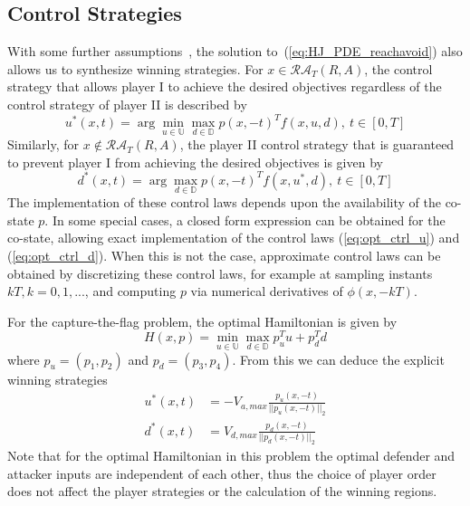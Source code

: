 \documentclass[letterpaper, 10 pt, conference]{ieeeconf}  %
\numberwithin{algorithm}{section}
\begin{document}
\subsection{Control Strategies}
\label{sub:ctrl_inputs}
With some further assumptions~\cite{j:Lygeros-automatica-1999,j:Tomlin-ProcIEEE-2000}, the solution to~(\ref{eq:HJ_PDE_reachavoid}) also allows us to synthesize winning strategies.  For $x \in \mathcal{RA}_T(R,A)$, the control strategy that allows player I to achieve the desired objectives regardless of the control strategy of player II is described by
\begin{equation}
	\label{eq:opt_ctrl_u}
  u^*(x,t) = \arg \min_{u \in \mathbb{U}} \max_{d \in \mathbb{D}} p(x,-t)^T f(x,u,d), \ t \in [0,T] 
\end{equation}
Similarly, for $x \notin \mathcal{RA}_T(R,A)$, the player II control strategy that is guaranteed to prevent player I from achieving the desired objectives is given by
\begin{equation}
	\label{eq:opt_ctrl_d}
  d^*(x,t) = \arg \max_{d \in \mathbb{D}} p(x,-t)^T f(x,u^*,d), \ t \in [0,T] 
\end{equation}
The implementation of these control laws depends upon the availability of the co-state $p$.  In some special cases, a closed form expression can be obtained for the co-state, allowing exact implementation of the control laws (\ref{eq:opt_ctrl_u}) and (\ref{eq:opt_ctrl_d}).  When this is not the case, approximate control laws can be obtained by discretizing these control laws, for example at sampling instants $kT, k = 0,1,...$, and computing $p$ via numerical derivatives of $\phi(x,-kT)$.  

For the capture-the-flag problem, the optimal Hamiltonian is given by
$$H\left(x,p\right) = \min_{u \in \mathbb{U}} \max_{d \in \mathbb{D}} p_u^T u + p_d^T d$$
where $p_u = (p_1, p_2)$ and $p_d = (p_3, p_4)$. From this we can deduce the explicit winning strategies
\begin{align}
	\label{eq:opt_ctf_u}
  u^*(x,t) &= -V_{a,max} \frac{p_u(x,-t)}{||p_u(x,-t)||_2} \\
	\label{eq:opt_ctf_d}
  d^*(x,t) &= V_{d,max} \frac{p_d(x,-t)}{||p_d(x,-t)||_2}
\end{align}
Note that for the optimal Hamiltonian in this problem the optimal defender and attacker inputs are independent of each other, thus the choice of player order does not affect the player strategies or the calculation of the winning regions. 

\end{document}
